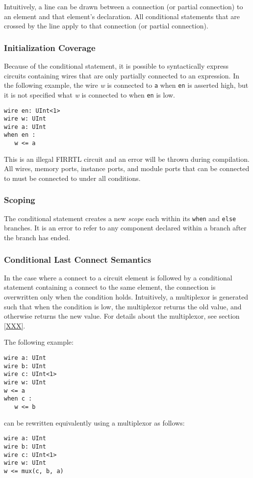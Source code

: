 \documentclass[12pt]{article}
\begin{document}
Intuitively, a line can be drawn between a connection (or partial connection) to an element and that element's declaration. All conditional statements that are crossed by the line apply to that connection (or partial connection).

\subsubsection{Initialization Coverage}
Because of the conditional statement, it is possible to syntactically express circuits containing wires that are only partially connected to an expression. In the following example, the wire {\em w} is connected to \verb|a| when \verb|en| is asserted high, but it is not specified what {\em w} is connected to when \verb|en| is low.

\begin{verbatim}
wire en: UInt<1>
wire w: UInt
wire a: UInt
when en :
   w <= a
\end{verbatim}

This is an illegal FIRRTL circuit and an error will be thrown during compilation. All wires, memory ports, instance ports, and module ports that can be connected to must be connected to under all conditions.

\subsubsection{Scoping}
The conditional statement creates a new {\em scope} each within its \verb|when| and \verb|else| branches. It is an error to refer to any component declared within a branch after the branch has ended.

\subsubsection{Conditional Last Connect Semantics}
In the case where a connect to a circuit element is followed by a conditional statement containing a connect to the same element, the connection is overwritten only when the condition holds. Intuitively, a multiplexor is generated such that when the condition is low, the multiplexor returns the old value, and otherwise returns the new value. For details about the multiplexor, see section \ref{XXX}.

The following example:
\begin{verbatim}
wire a: UInt
wire b: UInt
wire c: UInt<1>
wire w: UInt
w <= a
when c :
   w <= b
\end{verbatim}
can be rewritten equivalently using a multiplexor as follows:
\begin{verbatim}
wire a: UInt
wire b: UInt
wire c: UInt<1>
wire w: UInt
w <= mux(c, b, a)
\end{verbatim}
\end{document}
